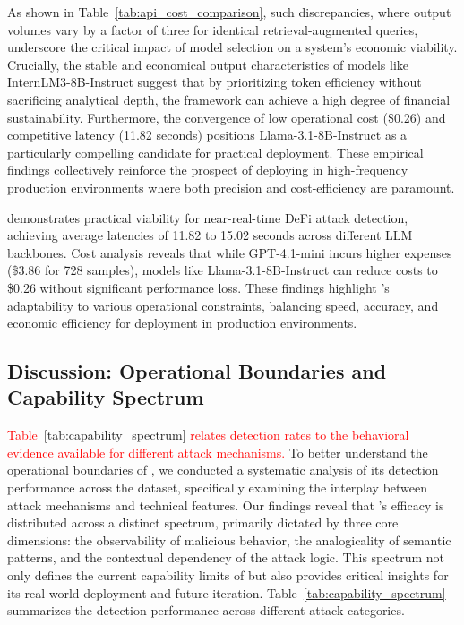 As shown in Table~\ref{tab:api_cost_comparison}, such discrepancies, where output volumes vary by a factor of three for identical retrieval-augmented queries, underscore the critical impact of model selection on a system's economic viability. Crucially, the stable and economical output characteristics of models like InternLM3-8B-Instruct suggest that by prioritizing token efficiency without sacrificing analytical depth, the \approach{} framework can achieve a high degree of financial sustainability. Furthermore, the convergence of low operational cost (\$0.26) and competitive latency (11.82 seconds) positions Llama-3.1-8B-Instruct as a particularly compelling candidate for practical deployment. These empirical findings collectively reinforce the prospect of deploying \approach{} in high-frequency production environments where both precision and cost-efficiency are paramount.

\begin{tcolorbox}[colback=black!5!white, colframe=black!75!black, sharp corners, fontupper=\small, title=Answer to RQ4, label=box:takeaways]
\approach{} demonstrates practical viability for near-real-time DeFi attack detection, achieving average latencies of 11.82 to 15.02 seconds across different LLM backbones. Cost analysis reveals that while GPT-4.1-mini incurs higher expenses (\$3.86 for 728 samples), models like Llama-3.1-8B-Instruct can reduce costs to \$0.26 without significant performance loss. These findings highlight \approach{}'s adaptability to various operational constraints, balancing speed, accuracy, and economic efficiency for deployment in production environments.
\end{tcolorbox}

\subsection{Discussion: Operational Boundaries and Capability Spectrum}

\textcolor{red}{Table~\ref{tab:capability_spectrum} relates detection rates to the behavioral evidence available for different attack mechanisms.}
To better understand the operational boundaries of \approach{}, we conducted a systematic analysis of its detection performance across the \dsystem{} dataset, specifically examining the interplay between attack mechanisms and technical features. Our findings reveal that \approach{}'s efficacy is distributed across a distinct spectrum, primarily dictated by three core dimensions: the observability of malicious behavior, the analogicality of semantic patterns, and the contextual dependency of the attack logic. This spectrum not only defines the current capability limits of \approach{} but also provides critical insights for its real-world deployment and future iteration. Table~\ref{tab:capability_spectrum} summarizes the detection performance across different attack categories.

